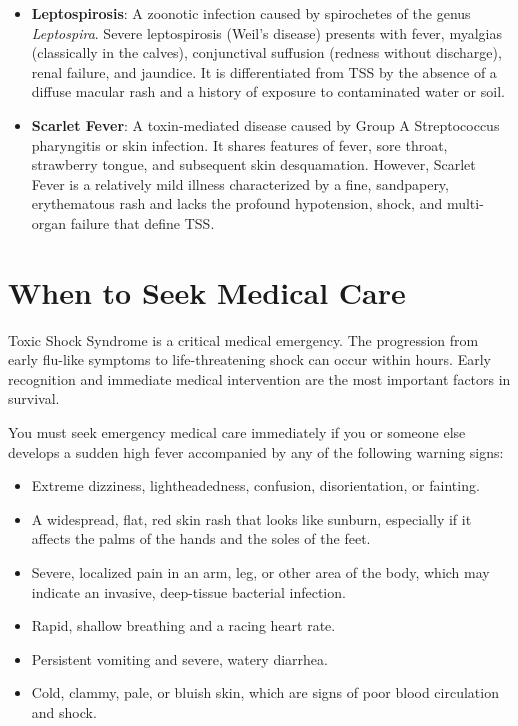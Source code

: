 \begin{itemize}
    \item \textbf{Leptospirosis}: A zoonotic infection caused by spirochetes of the genus \textit{Leptospira}. Severe leptospirosis (Weil's disease) presents with fever, myalgias (classically in the calves), conjunctival suffusion (redness without discharge), renal failure, and jaundice. It is differentiated from TSS by the absence of a diffuse macular rash and a history of exposure to contaminated water or soil.
    \item \textbf{Scarlet Fever}: A toxin-mediated disease caused by Group A Streptococcus pharyngitis or skin infection. It shares features of fever, sore throat, strawberry tongue, and subsequent skin desquamation. However, Scarlet Fever is a relatively mild illness characterized by a fine, sandpapery, erythematous rash and lacks the profound hypotension, shock, and multi-organ failure that define TSS.
\end{itemize}

\section*{When to Seek Medical Care}
Toxic Shock Syndrome is a critical medical emergency. The progression from early flu-like symptoms to life-threatening shock can occur within hours. Early recognition and immediate medical intervention are the most important factors in survival.

You must seek emergency medical care immediately if you or someone else develops a sudden high fever accompanied by any of the following warning signs:
\begin{itemize}
    \item Extreme dizziness, lightheadedness, confusion, disorientation, or fainting.
    \item A widespread, flat, red skin rash that looks like sunburn, especially if it affects the palms of the hands and the soles of the feet.
    \item Severe, localized pain in an arm, leg, or other area of the body, which may indicate an invasive, deep-tissue bacterial infection.
    \item Rapid, shallow breathing and a racing heart rate.
    \item Persistent vomiting and severe, watery diarrhea.
    \item Cold, clammy, pale, or bluish skin, which are signs of poor blood circulation and shock.
\end{itemize}

